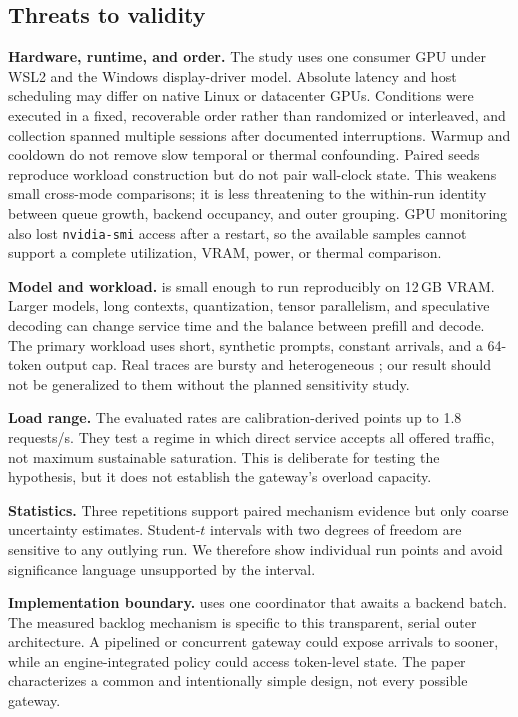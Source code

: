 \subsection{Threats to validity}

\textbf{Hardware, runtime, and order.} The study uses one consumer GPU under
WSL2 and the Windows display-driver model. Absolute latency and host scheduling
may differ on native Linux or datacenter GPUs. Conditions were executed in a
fixed, recoverable order rather than randomized or interleaved, and collection
spanned multiple sessions after documented interruptions. Warmup and cooldown
do not remove slow temporal or thermal confounding. Paired seeds reproduce
workload construction but do not pair wall-clock state. This weakens small
cross-mode comparisons; it is less threatening to the within-run identity
between queue growth, backend occupancy, and outer grouping. GPU monitoring
also lost \texttt{nvidia-smi} access after a restart, so the available samples
cannot support a complete utilization, VRAM, power, or thermal comparison.

\textbf{Model and workload.} \model{} is small enough to run reproducibly on
12\,GB VRAM. Larger models, long contexts, quantization, tensor parallelism,
and speculative decoding can change service time and the balance between
prefill and decode. The primary workload uses short, synthetic prompts,
constant arrivals, and a 64-token output cap. Real traces are bursty and
heterogeneous \citep{wang2024burstgpt}; our result should not be generalized to
them without the planned sensitivity study.

\textbf{Load range.} The evaluated rates are calibration-derived points up to
1.8 requests/s. They test a regime in which direct service accepts all offered
traffic, not maximum sustainable saturation. This is deliberate for testing
the hypothesis, but it does not establish the gateway's overload capacity.

\textbf{Statistics.} Three repetitions support paired mechanism evidence but
only coarse uncertainty estimates. Student-$t$ intervals with two degrees of
freedom are sensitive to any outlying run. We therefore show individual run
points and avoid significance language unsupported by the interval.

\textbf{Implementation boundary.} \adip{} uses one coordinator that awaits a
backend batch. The measured backlog mechanism is specific to this transparent,
serial outer architecture. A pipelined or concurrent gateway could expose
arrivals to \vllm{} sooner, while an engine-integrated policy could access
token-level state. The paper characterizes a common and intentionally simple
design, not every possible gateway.


